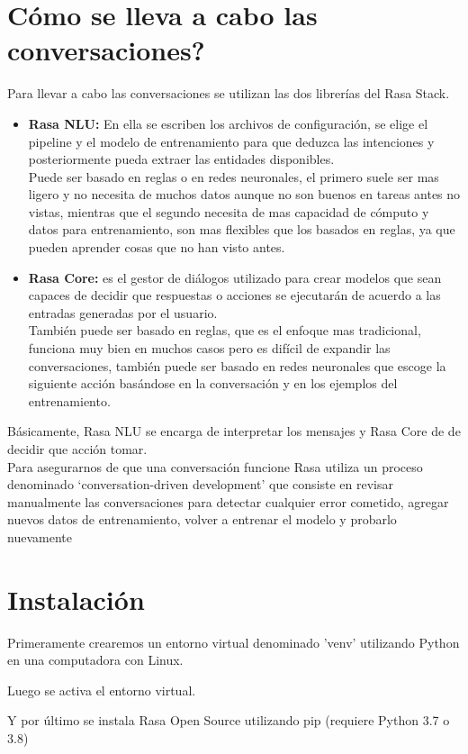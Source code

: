 \section{Cómo se lleva a cabo las conversaciones?}
Para llevar a cabo las conversaciones se utilizan las dos librerías del Rasa Stack.
\begin{itemize}
    \item \textbf{Rasa NLU: } En ella  se escriben los archivos de configuración, se elige el pipeline y el modelo de entrenamiento para que deduzca las intenciones y posteriormente pueda extraer las entidades disponibles.\\
    \indent Puede ser basado en reglas o en redes neuronales, el primero suele ser mas ligero y no necesita de muchos datos aunque no son buenos en tareas antes no vistas, mientras que el segundo necesita de mas capacidad de cómputo y datos para entrenamiento, son mas flexibles que los basados en reglas, ya que pueden aprender cosas que no han visto antes.
    \item \textbf{Rasa Core: } es el gestor de diálogos utilizado para crear modelos que sean capaces de decidir que respuestas o acciones se ejecutarán de acuerdo a las entradas generadas por el usuario.\\
    \indent También puede ser basado en reglas, que es el enfoque mas tradicional, funciona muy bien en muchos casos pero es difícil de expandir las conversaciones, también puede ser basado en redes neuronales que escoge la siguiente acción basándose en la conversación y en los ejemplos del entrenamiento.
\end{itemize}
\indent Básicamente, Rasa NLU se encarga de interpretar los mensajes y Rasa Core de de decidir que acción tomar.\\
\indent Para asegurarnos de que una conversación funcione Rasa utiliza un proceso denominado ‘conversation-driven development’ que consiste en revisar manualmente las conversaciones para detectar cualquier error cometido, agregar nuevos datos de entrenamiento, volver a entrenar el modelo y probarlo nuevamente\cite{Introduction_to_Rasa}
\section[Instalación de RASA]{Instalación}
Primeramente crearemos un entorno virtual denominado 'venv' utilizando Python en una computadora con Linux.

\begin{center}
\end{center}
Luego se activa el entorno virtual.
\begin{center}
\end{center}
Y por último se instala Rasa Open Source utilizando pip (requiere Python 3.7 o 3.8)
\begin{center}
\end{center}

